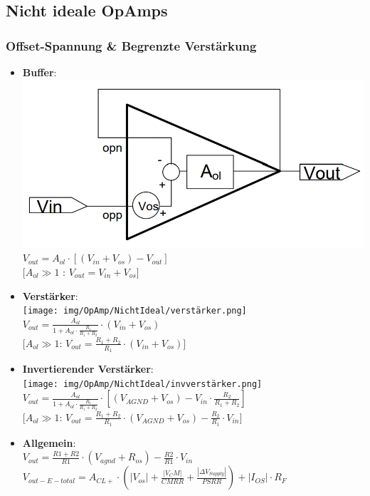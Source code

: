 \documentclass[margin=normal]{tex/hsrzf}
\begin{document}
\subsection{Nicht ideale OpAmps}
\begin{minipage}{0.49\textwidth}

  \small
  \subsubsection*{Offset-Spannung \& Begrenzte Verstärkung}
  \begin{itemize}[leftmargin=*]
    \item \textbf{Buffer}: \\
          \includegraphics[width = 0.6 \textwidth]{img/OpAmp/NichtIdeal/Buffer.png}
          \\ $V_{out} = A_{ol} \cdot [(V_{in}+V_{os}) - V_{out}]$
          \\ $[A_{ol}\gg 1$ : $V_{out} = V_{in} + V_{os}]$
    \item \textbf{Verstärker}: \\
          \texttt{[image: img/OpAmp/NichtIdeal/verstärker.png]}
          \\ $V_{out} = \frac{A_{ol}}{1+A_{ol}\cdot\frac{R_1}{R_1+R_2}}\cdot(V_{in}+V_{os}) $
          \\ $[A_{ol}\gg 1$: $V_{out} = \frac{R_1+R_2}{R_1}\cdot(V_{in}+V_{os})]$
    \item \textbf{Invertierender Verstärker}: \\
          \texttt{[image: img/OpAmp/NichtIdeal/invverstärker.png]}
          \\ $V_{out} = \frac{A_{ol}}{1+A_{ol}\cdot\frac{R_1}{R_1+R_2}}\cdot[(V_{AGND} + V_{os})-V_{in}\cdot\frac{R_2}{R_1+R_2}]$
          \\ $[A_{ol}\gg 1$: $V_{out} = \frac{R_1 + R_2}{R_1}\cdot(V_{AGND}+V_{os})-\frac{R_2}{R_1}\cdot V_{in}]$
    \item \textbf{Allgemein}: \\
          $V_{out} = \frac{R1 + R2}{R1}\cdot(V_{agnd}+R_{os})-\frac{R2}{R1}\cdot V_{in}$
          \\ $V_{out-E-total} = A_{CL+} \cdot(|V_{os}| + \frac{|V_CM|}{CMRR} + \frac{|\Delta V_{Supply}|}{PSRR}) + |I_{OS}| \cdot R_F$
  \end{itemize}
\end{minipage}%
\end{document}
